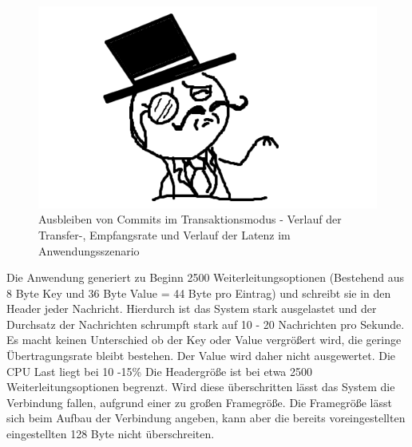 \documentclass[	a4paper,
			11pt,
			titlepage,
			oneside,
			fleqn,
			listof=totoc,
			parskip,
			numbers=noenddot]{scrartcl}
\begin{document}
		\begin{figure}[!htb]
			\centering
			\includegraphics[width=\textwidth]{img/stub.png}
			\caption{Ausbleiben von Commits im Transaktionsmodus - Verlauf der Transfer-, Empfangsrate und Verlauf der Latenz im Anwendungsszenario}
			\label{fig:commit-scenario}
		\end{figure}
	
	
	\clearpage
		{%
		  \newline
		  \newline
		  \newline
		}{%
		 Die Anwendung generiert zu Beginn 2500 Weiterleitungsoptionen (Bestehend aus 8 Byte Key und 36 Byte Value = 44 Byte pro Eintrag) und schreibt sie in den Header jeder Nachricht. Hierdurch ist das System stark ausgelastet und der Durchsatz der Nachrichten schrumpft stark auf 10 - 20 Nachrichten pro Sekunde. Es macht keinen Unterschied ob der Key oder Value vergrößert wird, die geringe Übertragungsrate bleibt bestehen. Der Value wird daher nicht ausgewertet. Die CPU Last liegt bei 10 -15\%
		}{%
		 Die Headergröße ist bei etwa 2500 Weiterleitungsoptionen begrenzt. Wird diese überschritten lässt das System die Verbindung fallen, aufgrund einer zu großen Framegröße. Die Framegröße lässt sich beim Aufbau der Verbindung angeben, kann aber die bereits voreingestellten eingestellten 128 Byte nicht überschreiten.
		}
\end{document}
